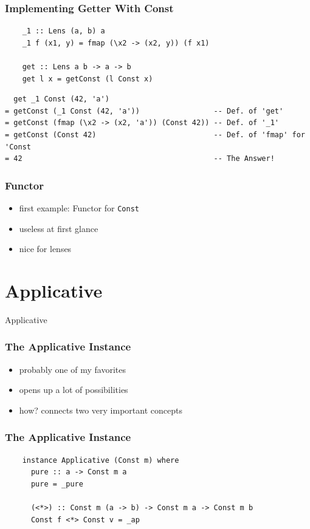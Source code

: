 \documentclass[aspectratio=169]{beamer}
\begin{document}
\begin{frame}[fragile]
  \frametitle{Implementing Getter With Const}
  \begin{verbatim}
    _1 :: Lens (a, b) a
    _1 f (x1, y) = fmap (\x2 -> (x2, y)) (f x1)

    get :: Lens a b -> a -> b
    get l x = getConst (l Const x)
  \end{verbatim}
  \vfill
  \begin{verbatim}
  get _1 Const (42, 'a')
= getConst (_1 Const (42, 'a'))                 -- Def. of 'get'
= getConst (fmap (\x2 -> (x2, 'a')) (Const 42)) -- Def. of '_1'
= getConst (Const 42)                           -- Def. of 'fmap' for 'Const
= 42                                            -- The Answer!
  \end{verbatim}
\end{frame}

\begin{frame}
  \frametitle{Functor}
  \begin{itemize}
  \item first example: Functor for \texttt{Const}
  \item useless at first glance
  \item nice for lenses
  \end{itemize}
\end{frame}

\section{Applicative}
\begin{frame}
  \begin{center}
    \Huge Applicative
  \end{center}
\end{frame}


\begin{frame}
  \frametitle{The Applicative Instance}
  \begin{itemize}
  \item probably one of my favorites
  \item opens up a lot of possibilities
  \item how? connects two very important concepts
  \end{itemize}
\end{frame}

\begin{frame}[fragile]
  \frametitle{The Applicative Instance}
  \begin{verbatim}
    instance Applicative (Const m) where
      pure :: a -> Const m a
      pure = _pure

      (<*>) :: Const m (a -> b) -> Const m a -> Const m b
      Const f <*> Const v = _ap
  \end{verbatim}
\end{frame}
\end{document}
